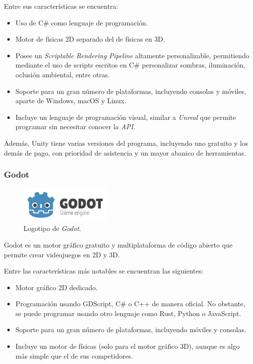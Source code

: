 \bigskip

Entre sus características se encuentra:

\begin{itemize}
   \item Uso de C\# como lenguaje de programación.
   \item Motor de físicas 2D separado del de físicas en 3D.
   \item Posee un \textit{Scriptable Rendering Pipeline} altamente personalizable, permitiendo mediante el uso de scripts escritos en C\# personalizar sombras, iluminación, oclusión ambiental, entre otras.
   \item Soporte para un gran número de plataformas, incluyendo consolas y móviles, aparte de Windows, macOS y Linux.
   \item Incluye un lenguaje de programación visual, similar a \textit{Unreal} que permite programar sin necesitar conocer la \textit{API}.
\end{itemize}
   
Además, Unity tiene varias versiones del programa, incluyendo uno gratuito y los demás de pago, con prioridad de asistencia y un mayor abanico de herramientas.

\subsubsection{Godot}

\begin{figure}[H]
   \centering
   \includegraphics[width=0.4\textwidth]{imagenes/GODOT_LOGO.png}
   \caption{Logotipo de \textit{Godot}\cite{godot-logo}.}
\end{figure}

Godot \cite{godot} es un motor gráfico gratuito y multiplataforma de código abierto que permite crear videojuegos en 2D y 3D. 

\bigskip

Entre las características más notables se encuentran las siguientes:

\begin{itemize}
   \item Motor gráfico 2D dedicado. 
   \item Programación usando GDScript, C\# o C++ de manera oficial. No obstante, se puede programar usando otro lenguaje como Rust, Python o JavaScript. 
   \item Soporte para un gran número de plataformas, incluyendo móviles y consolas.
   \item Incluye un motor de físicas (solo para el motor gráfico 3D), aunque es algo más simple que el de sus competidores.
\end{itemize}

